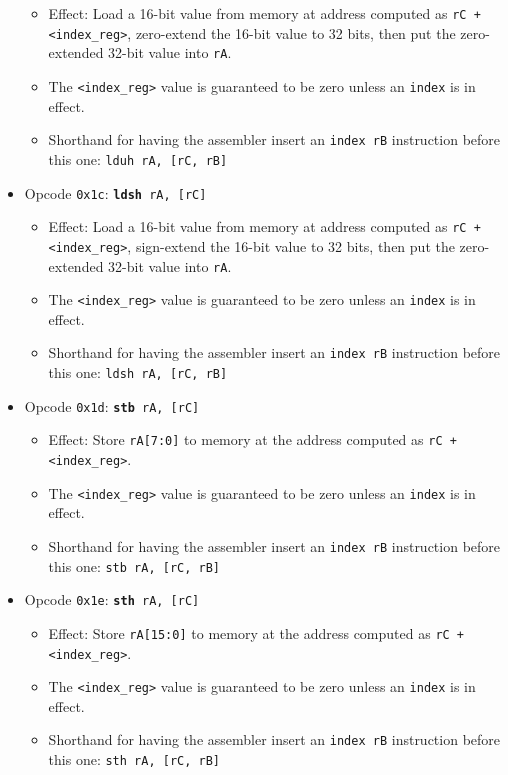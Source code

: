 \documentclass{article}
\begin{document}
\begin{itemize}
		\begin{itemize}
			\item Effect:  Load a 16-bit value from memory at address
			computed as \texttt{rC + <index\_reg>}, zero-extend
			the 16-bit value to 32 bits, then put the zero-extended 32-bit
			value into \texttt{rA}.
			\item The \texttt{<index\_reg>} value is guaranteed to be zero
			unless an \texttt{index} is in effect.
			\item Shorthand for having the assembler insert an
			\texttt{index rB} instruction before this one:
				\texttt{lduh rA, [rC, rB]}
		\end{itemize}
		\item Opcode \texttt{0x1c}:
			\texttt{\textbf{ldsh} rA, [rC]}
		\begin{itemize}
			\item Effect:  Load a 16-bit value from memory at address
			computed as \texttt{rC + <index\_reg>}, sign-extend
			the 16-bit value to 32 bits, then put the zero-extended 32-bit
			value into \texttt{rA}.
			\item The \texttt{<index\_reg>} value is guaranteed to be zero
			unless an \texttt{index} is in effect.
			\item Shorthand for having the assembler insert an
			\texttt{index rB} instruction before this one:
				\texttt{ldsh rA, [rC, rB]}
		\end{itemize}
		\item Opcode \texttt{0x1d}:
			\texttt{\textbf{stb} rA, [rC]}
		\begin{itemize}
			\item Effect:  Store \texttt{rA[7:0]} to memory at the address
			computed as \texttt{rC + <index\_reg>}.
			\item The \texttt{<index\_reg>} value is guaranteed to be zero
			unless an \texttt{index} is in effect.
			\item Shorthand for having the assembler insert an
			\texttt{index rB} instruction before this one:
				\texttt{stb rA, [rC, rB]}
		\end{itemize}
		\item Opcode \texttt{0x1e}:
			\texttt{\textbf{sth} rA, [rC]}
		\begin{itemize}
			\item Effect:  Store \texttt{rA[15:0]} to memory at the address
			computed as \texttt{rC + <index\_reg>}.
			\item The \texttt{<index\_reg>} value is guaranteed to be zero
			unless an \texttt{index} is in effect.
			\item Shorthand for having the assembler insert an
			\texttt{index rB} instruction before this one:
				\texttt{sth rA, [rC, rB]}
		\end{itemize}

	\end{itemize}
\end{document}
